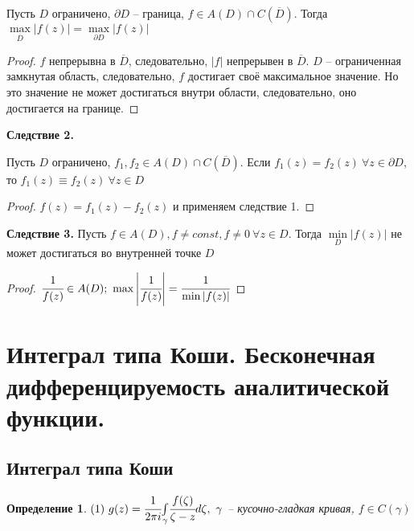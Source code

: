 \documentclass[final]{report}
\newcommand{\dd}{\partial}
\newcommand{\mint}[2]{\underset{#1}{\overset{#2}{\int}}}
\newcommand{\mmax}[1]{\underset{#1}{\max}}
\newcommand{\mmin}[1]{\underset{#1}{\min}}
\renewcommand{\bar}{\overline}
\newcommand{\g}{\gamma}
\newcommand{\F}{\ \forall}
\newcommand{\opr}[1]{\begin{opred}#1\end{opred}}
\newtheorem*{opred}{Определение}
\theoremstyle{remark}
\begin{document}
Пусть $D$ ограничено, $\dd D$ -- граница, $f\in A(D)\cap C(\bar{D})$. Тогда $\mmax{\bar{D}}|f(z)|=\mmax{\dd D}|f(z)|$
\begin{proof}
$f$ непрерывна в $\bar{D}$, следовательно, $|f|$ непрерывен в $\bar{D}$. $D$ -- ограниченная замкнутая область, следовательно, $f$ достигает своё максимальное значение. Но это значение не может достигаться внутри области, следовательно, оно достигается на границе.
\end{proof}
{\bfseries Следствие 2.}

Пусть $D$ ограничено, $f_1,f_2\in A(D)\cap C(\bar{D})$. Если $f_1(z)=f_2(z)\F z\in\dd D$, то $f_1(z)\equiv f_2(z)\F z\in D$
\begin{proof}
$f(z)=f_1(z)-f_2(z)$ и применяем следствие 1.
\end{proof}
{\bfseries Следствие 3.}
Пусть $f\in  A(D),f\neq const,f\neq 0\F z\in D$. Тогда $\mmin{D}|f(z)|$ не может достигаться во внутренней точке $D$
\begin{proof}
$\cfrac{1}{f(z)}\in A(D);\ \max\left|\cfrac{1}{f(z)}\right|=\cfrac{1}{\min|f(z)|}$
\end{proof}

\newpage

\section{Интеграл типа Коши. Бесконечная дифференцируемость аналитической функции.}

\subsection{Интеграл типа Коши}

\opr{$(1)\ g(z)=\cfrac 1{2\pi i}\mint{\g}{}\cfrac{f(\zeta)}{\zeta-z}d\zeta,\ \g$ -- кусочно-гладкая кривая, $f\in C(\g)$}
\end{document}
